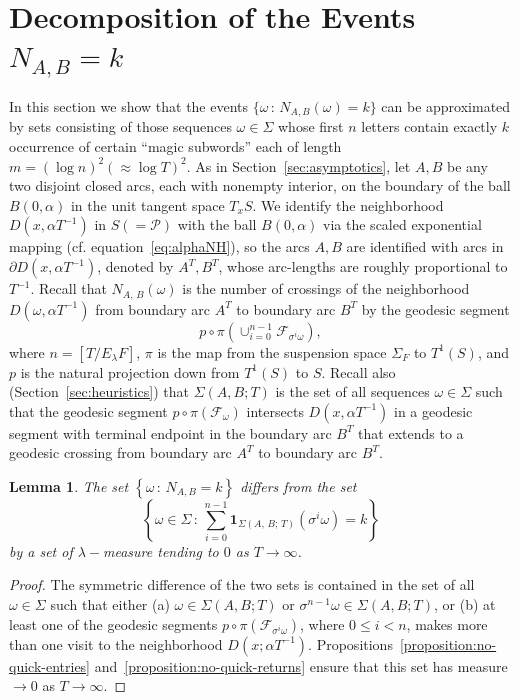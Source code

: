 \documentclass[10pt]{amsart}
\newtheorem{lemm}[theo]{Lemma}\newtheorem{prop}[theo]{Proposition}\newtheorem{coro}[theo]{Corollary}\newtheorem{conj}[theo]{Conjecture}
\theoremstyle{definition}\newtheorem{defi}[theo]{Definition}\newtheorem{rema}[theo]{Remark}\newtheorem{exam}[theo]{Example}\newtheorem{exem}[theo]{Example}\newtheorem{nota}[theo]{Notation}
\newcommand{\xset}[1]{\left\{ #1 \right\}}
\begin{document}
\section{Decomposition of the Events\texorpdfstring{$N_{A,B}=k$}{NA,B=k}}\label{sec:decomposition}

In this section we show that the events $\{\omega \,:\, N_{A,B} (\omega) =k\}$ can be approximated by sets consisting of those sequences $\omega \in \Sigma$ whose first $n$ letters contain exactly $k$ occurrence of certain ``magic subwords'' each of length $m= (\log n)^{2} (\approx \log T)^{2}$. As in Section~\ref{sec:asymptotics}, let $A,B$ be any two disjoint closed arcs, each with nonempty interior, on the boundary of the ball $B (0,\alpha)$ in the unit tangent space $T_x S$. We identify the neighborhood $D(x,\alpha T^{-1})$ in $S (=\mathcal{P})$ with the ball $B(0,\alpha)$ via the scaled exponential mapping (cf. equation~\eqref{eq:alphaNH}), so the arcs $A,B$ are identified with arcs in $\partial D(x,\alpha T^{-1})$, denoted by $A^{T},B^{T}$, whose arc-lengths are roughly proportional to $T^{-1}$. Recall that $N_{A,\,B} (\omega)$ is the number of crossings of the neighborhood $D(\omega,\alpha T^{-1}) $ from boundary arc $A^{T}$ to boundary arc $B^{T}$ by the geodesic segment
\[
p\circ\pi \left (\cup_{i=0}^{n-1}\mathcal{F}_{\sigma^{i}\omega}\right),
\]
where $n=[T/E_{\lambda}F]$, $\pi$ is the map from the suspension space $\Sigma_F$ to $T^1(S)$, and $p$ is the natural projection down from $T^1(S)$ to $S$. Recall also (Section~\ref{sec:heuristics}) that $\Sigma (A,B;T)$ is the set of all sequences $\omega \in \Sigma$ such that the geodesic segment $p\circ\pi(\mathcal{F}_{\omega})$ intersects $D(x, \alpha T^{-1})$ in a geodesic segment with terminal endpoint in the boundary arc $B^{T}$ that extends to a geodesic crossing from boundary arc $A^{T}$ to boundary arc $B^{T}$.

\begin{lemm}\label{lemma:n=k}
The set $\xset {\omega\,:\, N_{A,B}=k}$ differs from the set
\[
\xset {\omega \in \Sigma \,:\,
\sum_{i=0}^{n-1}\mathbf{1}_{\Sigma(A,\,B;\,T)}(\sigma^{i}\omega)=k }
\]
by a set of $\lambda-$measure tending to $0$ as $T \rightarrow \infty$.
\end{lemm}

\begin{proof}
The symmetric difference of the two sets is contained in the set of all $\omega\in\Sigma$ such that either (a) $\omega \in
\Sigma(A,B;T)$ or $\sigma^{n-1}\omega \in \Sigma(A,B;T)$, or (b) at least one of the geodesic segments $p\circ \pi (\mathcal{F}_{\sigma^{i}\omega})$, where $0 \leq i < n$, makes more than one visit to the neighborhood $D(x; \alpha T^{-1})$. Propositions~\ref{proposition:no-quick-entries} and~\ref{proposition:no-quick-returns} ensure that this set has measure $\rightarrow 0$ as $T \rightarrow \infty$.
\end{proof}
\end{document}
